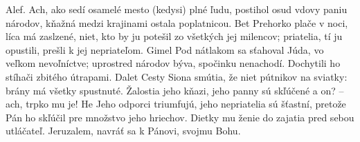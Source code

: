 Alef. 
Ach, ako sedí osamelé mesto
(kedysi) plné ľudu,
postihol osud vdovy
paniu národov,
kňažná medzi krajinami
ostala poplatnicou.
\versseparator
Bet
Prehorko plače v noci,
líca má zaslzené,
niet, kto by ju potešil
zo všetkých jej milencov;
priatelia, tí ju opustili,
prešli k jej nepriateľom.
\versseparator
Gimel
Pod nátlakom sa sťahoval Júda,
vo veľkom nevoľníctve;
uprostred národov býva,
spočinku nenachodí.
Dochytili ho stíhači
zbitého útrapami.
\versseparator
Dalet
Cesty Siona smútia,
že niet pútnikov na sviatky:
brány má všetky spustnuté.
Žalostia jeho kňazi,
jeho panny sú skľúčené
a on? – ach, trpko mu je!
\versseparator
He
Jeho odporci triumfujú,
jeho nepriatelia sú šťastní,
pretože Pán ho skľúčil
pre množstvo jeho hriechov.
Dietky mu ženie do zajatia
pred sebou utláčateľ.
\versseparator
Jeruzalem, navráť sa k Pánovi, svojmu Bohu.